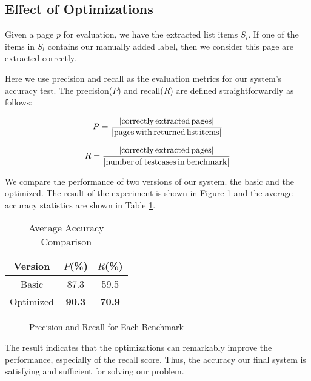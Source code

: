 \subsection{Effect of Optimizations}

Given a page $p$ for evaluation, 
we have the extracted list items $S_l$. 
If one of the items in $S_l$ contains our manually added label, 
then we consider this page are extracted correctly.

Here we use precision and recall as the evaluation metrics for our system's accuracy test. 
The precision($P$) and recall($R$) are defined straightforwardly as follows:

\begin{equation}
	P = \frac{|{\rm correctly\,extracted\,pages}|}{|{\rm pages\,with\,returned\,list\,items}|}
\end{equation}

\begin{equation}
	R = \frac{|{\rm correctly\,extracted\,pages}|}{|{\rm number\,of\,testcases\,in\,benchmark}|}
\end{equation}

We compare the performance of two versions of our system.
the basic and the optimized.
The result of the experiment is shown in Figure \ref{fig:PR} and 
the average accuracy statistics are shown in Table \ref{tab:EvalRes1}.

\begin{table}[tb]
\centering
\caption{Average Accuracy Comparison}
\label{tab:EvalRes1}
\begin{tabular}{|c||c|c|} 
\hline
Version & $ P$(\%) & $R$(\%)\\\hline \hline
Basic & 87.3 & 59.5 \\\hline
Optimized & {\bf 90.3} & {\bf 70.9} \\\hline
\end{tabular}
\end{table}

\begin{figure}[th]
	\centering
	\caption{Precision and Recall for Each Benchmark}
	\label{fig:PR}
\end{figure}

The result indicates that the optimizations can remarkably improve the performance,
especially of the recall score. 
Thus, the accuracy our final system is satisfying 
and sufficient for solving our problem.

